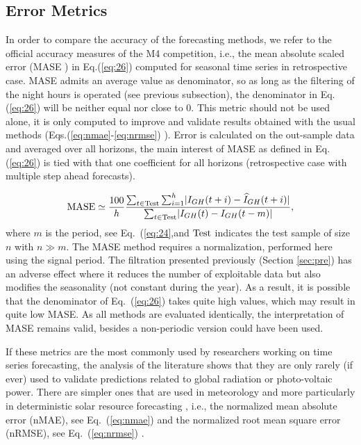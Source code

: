\subsection{Error Metrics}
In order to compare the accuracy of the forecasting methods, we refer to the official accuracy measures of the M4 competition, i.e., the mean absolute scaled error (MASE \citep{HYNDMAN2006679}) in Eq.(\ref{eq:26})  computed for seasonal time series in retrospective case. MASE admits an average value as denominator, so as long as the filtering of the night hours is operated (see previous subsection), the denominator in Eq.(\ref{eq:26}) will be neither equal nor close to 0. This metric should not be used alone, it is only computed to improve and validate results obtained with the usual methods (Eqs.(\ref{eq:nmae}-\ref{eq:nrmse}) \citep{YANG202020}). Error is calculated on the out-sample data and averaged over all horizons, the main interest of MASE as defined in Eq.(\ref{eq:26}) is tied with that one coefficient for all horizons (retrospective case with multiple step ahead forecasts). 

\begin{equation}
\label{eq:26}
    \textnormal{MASE}\simeq \frac{100}{h}\frac{\sum_{t\in \textnormal{Test}}\sum_{i=1}^{h}\lvert I_{GH}(t+i)-\widehat{I}_{GH}(t+i)\lvert}{\sum_{t\in \textnormal{Test}}\lvert I_{GH}(t)-I_{GH}(t-m)\lvert},
\end{equation}
where $m$ is the period, see Eq.~(\ref{eq:24},and $\textnormal{Test}$ indicates the test sample of size $n$ with $n\gg m$. The MASE method requires a normalization, performed here using the signal period. The filtration presented previously (Section \ref{sec:pre}) has an adverse effect where it reduces the number of exploitable data but also modifies the seasonality (not constant during the year). As a result, it is possible that the denominator of Eq.~(\ref{eq:26}) takes quite high values, which may result in quite low MASE. As all methods are evaluated identically, the interpretation of MASE remains valid, besides a non-periodic version could have been used.

If these metrics are the most commonly used by researchers working on time series forecasting, the analysis of the literature shows that they are only rarely (if ever) used to validate predictions related to global radiation or photo-voltaic power. There are simpler ones that are used in meteorology and more particularly in deterministic solar resource forecasting \citep{YANG202020}, i.e., the normalized mean absolute error (nMAE), see Eq.~(\ref{eq:nmae}) and the normalized root mean square error (nRMSE), see Eq.~(\ref{eq:nrmse}) \citep{metrics}.

